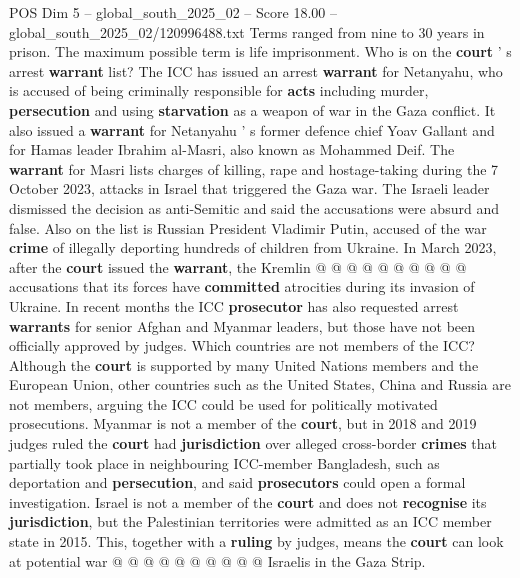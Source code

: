 \begin{textsample}{POS Dim 5 – global\_south\_2025\_02 – Score 18.00 – global\_south\_2025\_02/120996488.txt}
Terms ranged from nine to 30 years in prison.
The maximum possible term is life imprisonment.
Who is on the \textbf{court} ' s arrest \textbf{warrant} list?
The ICC has issued an arrest \textbf{warrant} for Netanyahu, who is accused of being criminally responsible for \textbf{acts} including murder, \textbf{persecution} and using \textbf{starvation} as a weapon of war in the Gaza conflict.
It also issued a \textbf{warrant} for Netanyahu ' s former defence chief Yoav Gallant and for Hamas leader Ibrahim al-Masri, also known as Mohammed Deif.
The \textbf{warrant} for Masri lists charges of killing, rape and hostage-taking during the 7 October 2023, attacks in Israel that triggered the Gaza war.
The Israeli leader dismissed the decision as anti-Semitic and said the accusations were absurd and false.
Also on the list is Russian President Vladimir Putin, accused of the war \textbf{crime} of illegally deporting hundreds of children from Ukraine.
In March 2023, after the \textbf{court} issued the \textbf{warrant}, the Kremlin @ @ @ @ @ @ @ @ @ @ accusations that its forces have \textbf{committed} atrocities during its invasion of Ukraine.
In recent months the ICC \textbf{prosecutor} has also requested arrest \textbf{warrants} for senior Afghan and Myanmar leaders, but those have not been officially approved by judges.
Which countries are not members of the ICC?
Although the \textbf{court} is supported by many United Nations members and the European Union, other countries such as the United States, China and Russia are not members, arguing the ICC could be used for politically motivated prosecutions.
Myanmar is not a member of the \textbf{court}, but in 2018 and 2019 judges ruled the \textbf{court} had \textbf{jurisdiction} over alleged cross-border \textbf{crimes} that partially took place in neighbouring ICC-member Bangladesh, such as deportation and \textbf{persecution}, and said \textbf{prosecutors} could open a formal investigation.
Israel is not a member of the \textbf{court} and does not \textbf{recognise} its \textbf{jurisdiction}, but the Palestinian territories were admitted as an ICC member state in 2015.
This, together with a \textbf{ruling} by judges, means the \textbf{court} can look at potential war @ @ @ @ @ @ @ @ @ @ Israelis in the Gaza Strip.

\end{textsample}
